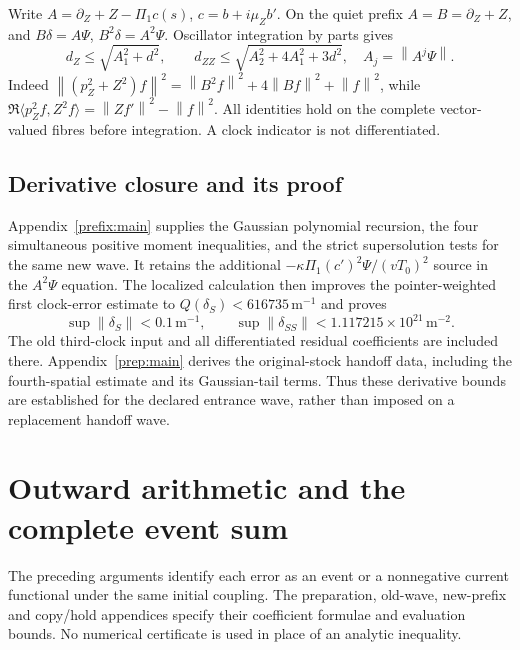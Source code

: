 \documentclass[11pt]{article}
\theoremstyle{definition}\newtheorem{definition}[theorem]{Definition}
\theoremstyle{remark}\newtheorem{remark}[theorem]{Remark}
\newcommand{\norm}[1]{\left\lVert#1\right\rVert}
\begin{document}
Write $A=\partial_Z+Z-\Pi_1c(s)$, $c=b+i\mu_Zb'$.
On the quiet prefix $A=B=\partial_Z+Z$, and
$B\delta=A\Psi$, $B^2\delta=A^2\Psi$. Oscillator integration by parts gives
\[
 d_Z\le\sqrt{A_1^2+d^2},\qquad
 d_{ZZ}\le\sqrt{A_2^2+4A_1^2+3d^2},
 \quad A_j=\norm{A^j\Psi}.
\]
Indeed $\norm{(p_Z^2+Z^2)f}^2
=\norm{B^2f}^2+4\norm{Bf}^2+\norm f^2$, while
$\Re\langle p_Z^2f,Z^2f\rangle=\norm{Zf'}^2-\norm f^2$.
All identities hold on the complete vector-valued fibres before
integration. A clock indicator is not differentiated.

\subsection{Derivative closure and its proof}
Appendix~\ref{prefix:main} supplies the Gaussian polynomial recursion,
the four simultaneous positive moment inequalities, and the strict
supersolution tests for the same new wave. It retains the additional
$-\kappa\Pi_1(c')^2\Psi/(vT_0)^2$ source in the $A^2\Psi$ equation.
The localized calculation then improves the pointer-weighted first
clock-error estimate to $Q(\delta_S)<616735\,\mathrm m^{-1}$ and proves
\[
 \sup\|\delta_S\|<0.1\,\mathrm m^{-1},\qquad
 \sup\|\delta_{SS}\|<1.117215\times10^{21}\,\mathrm m^{-2}.
\]
The old third-clock input and all differentiated residual coefficients
are included there. Appendix~\ref{prep:main} derives the original-stock
handoff data, including the fourth-spatial estimate and its Gaussian-tail
terms. Thus these derivative bounds are established for the declared
entrance wave, rather than imposed on a replacement handoff wave.

\section{Outward arithmetic and the complete event sum}\label{sec:events}
The preceding arguments identify each error as an event or a nonnegative
current functional under the same initial coupling. The preparation,
old-wave, new-prefix and copy/hold appendices specify their coefficient
formulae and evaluation bounds. No numerical certificate is used in
place of an analytic inequality.
\end{document}
